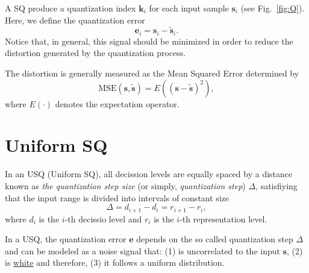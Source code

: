 A SQ produce a quantization index ${\mathbf k}_i$ for each input sample
${\mathbf s}_i$ (see Fig.~\ref{fig:Q}). Here, we define the quantization error
\begin{equation}
  {\mathbf e}_i = {\mathbf s}_i - \tilde{{\mathbf s}}_i.
\end{equation}
Notice that, in general, this signal should be minimized in order to
reduce the distortion generated by the quantization process.

The distortion is generally measured as the Mean Squared Error determined by
\begin{equation}
  \text{MSE}({\mathbf s}, \tilde{\mathbf s}) = E(({\mathbf s} - \tilde{\mathbf s})^2),
  \label{eq:MSE}
\end{equation}
where $E(\cdot)$ denotes the expectation operator.


\section{Uniform SQ}

In an USQ (Uniform SQ), all decission levels are equally spaced by a
distance known as \emph{the quantization step size} (or simply,
\emph{quantization step}) \(\Delta\), satisfiying that the input range
is divided into intervals of constant size
\begin{equation}
  \Delta=d_{i+1}-d_i=r_{i+1}-r_i,
\end{equation}
where $d_i$ is the $i$-th decissio level and $r_i$ is the $i$-th
representation level.

In a USQ, the quantization error ${\mathbf e}$ depends on the so
called quantization step $\Delta$ and can be modeled as a noise signal
that: (1) is uncorrelated to the input ${\mathbf s}$, (2) is
\href{https://en.wikipedia.org/wiki/White_noise}{white} and therefore,
(3) it follows a uniform distribution.




